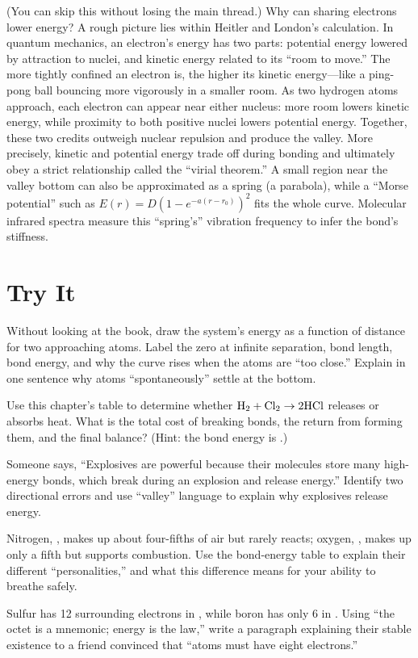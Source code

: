 \begin{tiaozhan}
(You can skip this without losing the main thread.) Why can sharing electrons lower energy? A rough picture lies within Heitler and London's calculation. In quantum mechanics, an electron's energy has two parts: potential energy lowered by attraction to nuclei, and kinetic energy related to its ``room to move.'' The more tightly confined an electron is, the higher its kinetic energy---like a ping-pong ball bouncing more vigorously in a smaller room. As two hydrogen atoms approach, each electron can appear near either nucleus: more room lowers kinetic energy, while proximity to both positive nuclei lowers potential energy. Together, these two credits outweigh nuclear repulsion and produce the valley. More precisely, kinetic and potential energy trade off during bonding and ultimately obey a strict relationship called the ``virial theorem.'' A small region near the valley bottom can also be approximated as a spring (a parabola), while a ``Morse potential'' such as $E(r)=D\left(1-e^{-a(r-r_0)}\right)^2$ fits the whole curve. Molecular infrared spectra measure this ``spring's'' vibration frequency to infer the bond's stiffness.
\end{tiaozhan}

\section*{Try It}

\begin{sikaoti}
\item Without looking at the book, draw the system's energy as a function of distance for two approaching atoms. Label the zero at infinite separation, bond length, bond energy, and why the curve rises when the atoms are ``too close.'' Explain in one sentence why atoms ``spontaneously'' settle at the bottom.
\item Use this chapter's table to determine whether $\mathrm{H_2} + \mathrm{Cl_2} \rightarrow \mathrm{2HCl}$ releases or absorbs heat. What is the total cost of breaking bonds, the return from forming them, and the final balance? (Hint: the  bond energy is .)
\item Someone says, ``Explosives are powerful because their molecules store many high-energy bonds, which break during an explosion and release energy.'' Identify two directional errors and use ``valley'' language to explain why explosives release energy.
\item Nitrogen, , makes up about four-fifths of air but rarely reacts; oxygen, , makes up only a fifth but supports combustion. Use the bond-energy table to explain their different ``personalities,'' and what this difference means for your ability to breathe safely.
\item Sulfur has 12 surrounding electrons in , while boron has only 6 in . Using ``the octet is a mnemonic; energy is the law,'' write a paragraph explaining their stable existence to a friend convinced that ``atoms must have eight electrons.''
\end{sikaoti}
